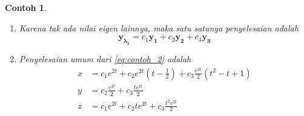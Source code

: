 \documentclass[a4paper]{article}
\theoremstyle{definisi}
\newtheorem{contoh}{Contoh}[section]
\numberwithin{equation}{section}
\begin{document}
\begin{contoh}
\begin{enumerate}[label=Langkah \arabic*: ,leftmargin=*]
\begin{align*}
\begin{pmatrix}
          -1\\1\\0
        \end{pmatrix}\frac{te^{2t}}{2}+\begin{pmatrix}
          1\\0\\1
        \end{pmatrix}\frac{t^2}{2}e^{2t}
      \end{align*}
      \item Karena tak ada nilai eigen lainnya, maka satu satunya penyelesaian adalah
      \begin{equation*}
        \mathbf{y_{\lambda_1}}= c_1\mathbf{y_1}+c_2\mathbf{y_2}+c_3\mathbf{y_3}
      \end{equation*}
      \item Penyelesaian umum dari \eqref{eq:contoh_2} adalah
      \begin{align*}
        x&=c_1e^{2t}+c_2e^{2t}\left(t-\frac{1}{2}\right)+c_3\frac{e^{2t}}{2}\left(t^2-t+1\right)\\
        y&=c_2\frac{{e^{2t}}}{2}+c_3\frac{te^{2t}}{2}\\
        z&=c_1e^{2t}+c_2te^{2t}+c_3\frac{t^2e^{2t}}{2}
      \end{align*}
    \end{enumerate}
  \end{contoh}
\end{document}
